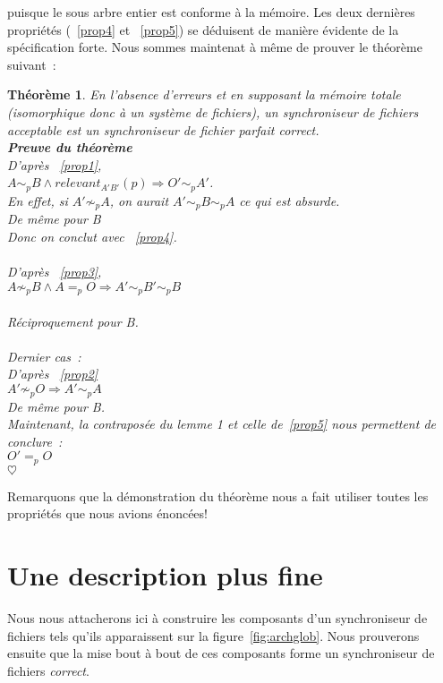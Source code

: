 \documentclass[11pt]{report}
\newtheorem{theor}{Th\'eor\`eme}
\newcommand{\preuve}[2]{\textbf{Preuve #1} \\
#2\\
$\heartsuit$\\}
\begin{document}
{{puisque le sous arbre entier est conforme \`a la m\'emoire.
}
Les deux derni\`eres propri\'et\'es (~\ref{prop4} et ~\ref{prop5}) se d\'eduisent de mani\`ere \'evidente de
la sp\'ecification forte.
Nous sommes maintenat \`a m\^eme de prouver le th\'eor\`eme suivant~:
\begin{theor}
En l'absence d'erreurs et en supposant la m\'emoire \emph{totale} 
(isomorphique donc \`a un syst\`eme de fichiers), un synchroniseur de 
fichiers \emph{acceptable} est un synchroniseur de fichier \emph{parfait
  correct}.\\
\preuve{du th\'eor\`eme}{
D'apr\`es ~\ref{prop1},\\
$A \sim_{p} B \wedge \mathit{relevant}_{A'B'}(p)
\Rightarrow O' \sim_{p} A'$.\\
En effet, si $A' \not\sim_{p} A$, on aurait $A' \sim_{p} B \sim_{p} A$ ce qui
est absurde.\\
De m\^eme pour B\\
Donc on conclut avec ~\ref{prop4}.\\\\  
D'apr\`es ~\ref{prop3},\\
$A \not\sim_{p} B \wedge A =_{p} O \Rightarrow A' \sim_{p} B' \sim_{p} B$\\\\
R\'eciproquement pour B.\\\\
Dernier cas~:\\
D'apr\`es ~\ref{prop2}\\
$A' \not\sim_{p} O \Rightarrow A' \sim_{p} A$\\
De m\^eme pour B.\\
Maintenant, la contrapos\'ee du lemme 1 et celle de~\ref{prop5} nous permettent
de conclure~:\\
$O' =_{p} O$}
\end{theor}
Remarquons que la d\'emonstration du th\'eor\`eme nous a fait utiliser toutes
les propri\'et\'es que nous avions \'enonc\'ees!
        \section{Une description plus fine}
Nous nous attacherons ici \`a construire les composants d'un synchroniseur
de fichiers tels qu'ils apparaissent sur la figure~\ref{fig:archglob}.
Nous prouverons ensuite que la mise bout \`a bout de ces composants forme
un synchroniseur de fichiers \emph{correct}.
}
\end{document}
